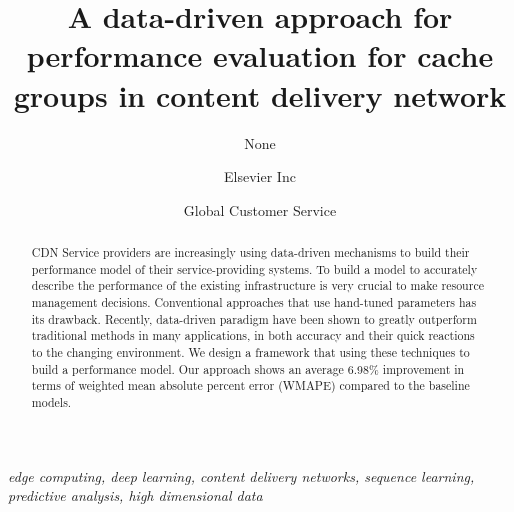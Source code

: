 \documentclass[5p]{elsarticle}
\begin{document}
\begin{frontmatter}

\title{A data-driven approach for performance evaluation for cache groups in content delivery network
    }

\author{None
    }
\address{Radarweg 29, Amsterdam}

\author[mymainaddress,mysecondaryaddress]{Elsevier Inc}

\author[mysecondaryaddress]{Global Customer Service}

\address[mymainaddress]{1600 John F Kennedy Boulevard, Philadelphia}
\address[mysecondaryaddress]{360 Park Avenue South, New York}

\begin{abstract}
CDN Service providers are increasingly using data-driven mechanisms to build their performance model of their service-providing systems. To build a model to accurately describe the performance of the existing infrastructure is very crucial to make resource management decisions. Conventional approaches that use hand-tuned parameters has its drawback. Recently, data-driven paradigm have been shown to greatly outperform traditional methods in many applications, in both accuracy and their quick reactions to the changing environment. We design a framework that using these techniques to build a performance model. Our approach shows an average 6.98\% improvement in terms of weighted mean absolute percent error (WMAPE) compared to the baseline models.
\end{abstract}
\begin{keyword}
\textit{edge computing, deep learning, content delivery networks, sequence learning, predictive analysis, high dimensional data}
\end{keyword}
\end{frontmatter}
\linenumbers
\end{document}
